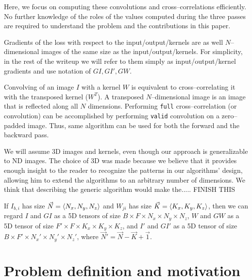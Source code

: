   Here, we focus on computing these convolutions and
  cross--correlations efficiently.  No further knowledge of the roles
  of the values computed during the three passes are required to
  understand the problem and the contributions in this paper.

  Gradients of the loss with respect to the input/output/kernels are
  as well $N$--dimensional images of the same size as the
  input/output/kernels.  For simplicity, in the rest of the writeup we
  will refer to them simply as input/output/kernel gradients and use
  notation of $GI, GI', GW$.

  Convolving of an image $I$ with a kernel $W$ is equivalent to
  cross--correlating it with the transposed kernel ($W^T$).  A
  transposed $N$--dimensional image is an image that is reflected
  along all $N$ dimensions.  Performing \texttt{full}
  cross--correlation (or convolution) can be accomplished by
  performing \texttt{valid} convolution on a zero--padded image.
  Thus, same algorithm can be used for both the forward and the
  backward pass.

  We will assume 3D images and kernels, even though our approach is
  generalizable to ND images.  The choice of 3D was made because we
  believe that it provides enough insight to the reader to recognize
  the patterns in our algorithms' design, allowing him to extend the
  algorithms to an arbitrary number of dimensions.  We think that
  describing the generic algorithm would make the..... FINISH THIS


  If $I_{b,i}$ has size $\vec{N} = \langle N_x, N_y, N_z\rangle$ and
  $W_{ji}$ has size $\vec{K} = \langle K_x,K_y,K_z\rangle$, then we can
  regard $I$ and $GI$ as a 5D tensors of size $B \times F \times N_x
  \times N_y \times N_z$, $W$ and $GW$ as a 5D tensor of size $F'
  \times F \times K_x \times K_y \times K_z$, and $I'$ and $GI'$ as a
  5D tensor of size $B \times F' \times N_x' \times N_y' \times N_z'$,
  where $\vec{N}' = \vec{N} - \vec{K} + \vec{1}$.

\section{Problem definition and motivation}

